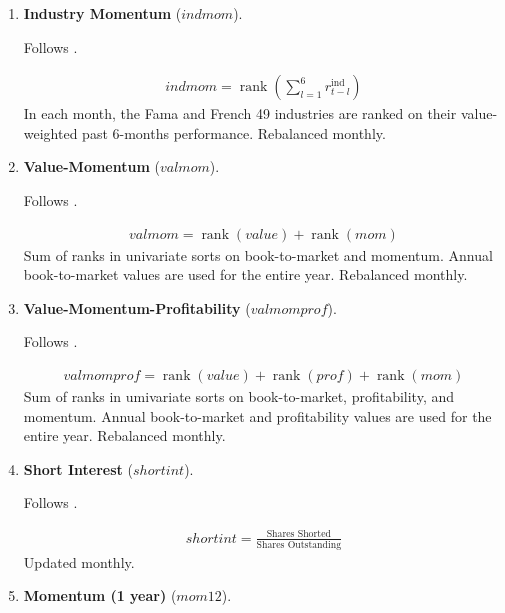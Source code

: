 \begin{enumerate}
	
	
	\item \textbf{Industry Momentum} ($indmom$). 
	
	Follows . 
	
	\begin{align*}
		indmom = \operatorname{rank} \left( \sum_{l=1}^6 r_{t-l}^{\text{ind}} \right)
	\end{align*}
	In each month, the Fama and French 49 industries are ranked on their value-weighted past 6-months performance. Rebalanced monthly.
	
	
	
	\item \textbf{Value-Momentum} ($valmom$). 
	
	Follows . 
	
	\begin{align*}
		valmom =\operatorname{rank}(value) + \operatorname{rank}(mom)
	\end{align*}
	Sum of ranks in univariate sorts on book-to-market and momentum. Annual book-to-market values are used for the entire year. Rebalanced monthly.
	
	
	
	\item \textbf{Value-Momentum-Profitability} ($valmomprof$). 
	
	Follows . 
	
	\begin{align*}
		valmomprof =\operatorname{rank}(value) + \operatorname{rank}(prof) + \operatorname{rank}(mom)
	\end{align*}
	Sum of ranks in umivariate sorts on book-to-market, profitability, and momentum. Annual book-to-market and profitability values are used for the entire year. Rebalanced monthly.
	
	
	
	\item \textbf{Short Interest} ($shortint$). 
	
	Follows . 
	
	\begin{align*}
		shortint = \frac{ \text{Shares Shorted} }{ \text{Shares Outstanding} }
	\end{align*}	
	Updated monthly.
	
	
	
	\item \textbf{Momentum (1 year)} ($mom12$). 
	

\end{enumerate}
